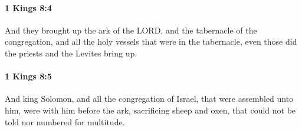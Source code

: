 		\paragraph{1 Kings 8:4} %
			\label{1KINGS-8-4}

			And they brought up the ark of the LORD, and the tabernacle of the congregation, and all the holy vessels that were in the tabernacle, even those did the priests and the Levites bring up.


		\paragraph{1 Kings 8:5} %
			\label{1KINGS-8-5}

			And king Solomon, and all the congregation of Israel, that were assembled unto him, were with him before the ark, sacrificing sheep and oxen, that could not be told nor numbered for multitude.


